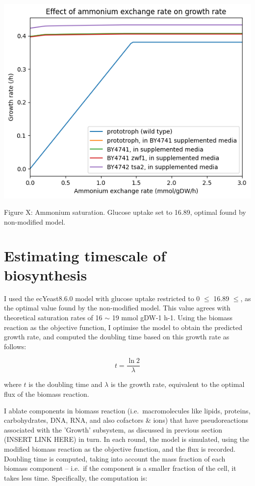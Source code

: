 \begin{center}
\includegraphics[width=.9\linewidth]{ecYeast8-ammonium-saturation.png}
\end{center} Figure X: Ammonium saturation.  Glucose uptake set to 16.89, optimal found by non-modified model.

\section{Estimating timescale of biosynthesis}
\label{sec:model-timescale}

I used the ecYeast8.6.0 model with glucose uptake restricted to 0 $\leq$ 16.89 $\leq$, as the optimal value found by the non-modified model.
This value agrees with theoretical saturation rates of 16 $\sim$ 19 mmol gDW-1 h-1.
Using the biomass reaction as the objective function, I optimise the model to obtain the predicted growth rate, and computed the doubling time based on this growth rate as follows:

\begin{equation}
  t = \frac{\ln 2}{\lambda}
\end{equation}

where $t$ is the doubling time and $\lambda$ is the growth rate, equivalent to the optimal flux of the biomass reaction.

I ablate components in biomass reaction (i.e.\ macromolecules like lipids, proteins, carbohydrates, DNA, RNA, and also cofactors \& ions) that have pseudoreactions associated with the 'Growth' subsystem, as discussed in previous section (INSERT LINK HERE) in turn.
In each round, the model is simulated, using the modified biomass reaction as the objective function, and the flux is recorded.
Doubling time is computed, taking into account the mass fraction of each biomass component -- i.e.\ if the component is a smaller fraction of the cell, it takes less time.
Specifically, the computation is:

